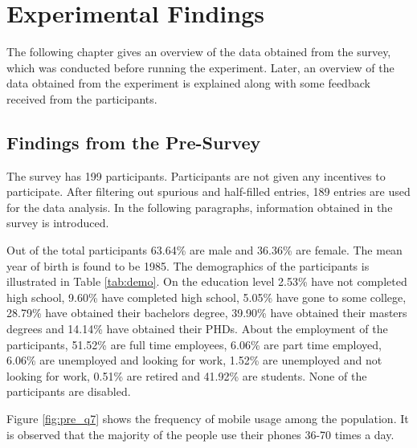 \chapter{Experimental Findings}
The following chapter gives an overview of the data obtained from the survey, which was conducted before running the experiment.
Later, an overview of the data obtained from the experiment is explained along with some feedback received from the participants.

\section{Findings from the Pre-Survey}
The survey has 199 participants. Participants are not given any incentives to participate. After filtering out spurious and half-filled entries, 189 entries are used for the data analysis. In the following paragraphs, information obtained in the survey is introduced.

Out of the total
participants 63.64\% are male and 36.36\% are female. The mean year of birth is found to be 1985. The demographics of the participants is illustrated in Table \ref{tab:demo}. On the education level 2.53\% have not completed high school, 9.60\% have completed high school, 5.05\% have gone to some college, 28.79\% have obtained their bachelors degree, 39.90\% have obtained their masters degrees and 14.14\% have obtained their PHDs. About the employment of the participants, 51.52\% are full time employees, 6.06\% are part time employed, 6.06\% are unemployed and looking for work, 1.52\% are unemployed and not looking for work, 0.51\% are retired and 41.92\% are students. None of the participants are disabled. 


Figure \ref{fig:pre_q7} shows the frequency of mobile usage among the population. It is observed that the majority of the people use their phones 36-70 times a day.

